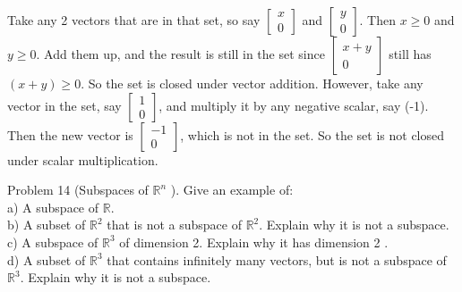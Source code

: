 \documentclass[10pt]{article}
\begin{document}
Take any 2 vectors that are in that set, so say $\left[\begin{array}{l}x \\ 0\end{array}\right]$ and $\left[\begin{array}{l}y \\ 0\end{array}\right]$. Then $x \geq 0$ and $y \geq 0$. Add them up, and the result is still in the set since $\left[\begin{array}{c}x+y \\ 0\end{array}\right]$ still has $(x+y) \geq 0$. So the set is closed under vector addition. However, take any vector in the set, say $\left[\begin{array}{l}1 \\ 0\end{array}\right]$, and multiply it by any negative scalar, say (-1). Then the new vector is $\left[\begin{array}{c}-1 \\ 0\end{array}\right]$, which is not in the set. So the set is not closed under scalar multiplication.

Problem 14 (Subspaces of $\mathbb{R}^{n}$ ). Give an example of:\\
a) A subspace of $\mathbb{R}$.\\
b) A subset of $\mathbb{R}^{2}$ that is not a subspace of $\mathbb{R}^{2}$. Explain why it is not a subspace.\\
c) A subspace of $\mathbb{R}^{3}$ of dimension 2. Explain why it has dimension 2 .\\
d) A subset of $\mathbb{R}^{3}$ that contains infinitely many vectors, but is not a subspace of $\mathbb{R}^{3}$. Explain why it is not a subspace.
\end{document}
